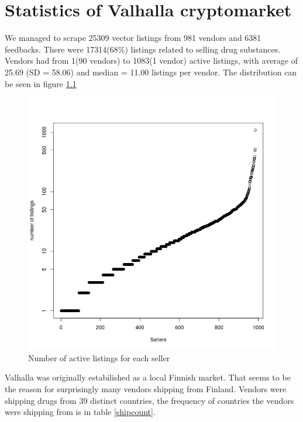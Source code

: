 \documentclass[
  digital, %
  table,   %
  lof,     %
  lot,     %
  oneside
]{fithesis3}
\begin{document}
\chapter{Statistics of Valhalla cryptomarket}

We managed to scrape 25309 vector listings from 981 vendors and 6381 feedbacks.
There were 17314(68\%) listings related to selling drug substances.
Vendors had from 1(90 vendors) to 1083(1 vendor)
active listings, with average of 25.69 (SD = 58.06)
and median = 11.00 listings per vendor.
The distribution can be seen in figure \ref{listingsxsellers}

\begin{figure}[!htb]
    \centering
    \includegraphics[scale=0.4]{listingsxsellers}
    \caption{Number of active listings for each seller}
    \label{listingsxsellers}
\end{figure}

Valhalla was originally estabilished as a local Finnish market.
That seems to be the reason for surprisingly many vendors shipping from Finland.
Vendors were shipping drugs from 39 distinct countries,
the frequency of countries the vendors were shipping from is in table \ref{shipcount}.
\end{document}
